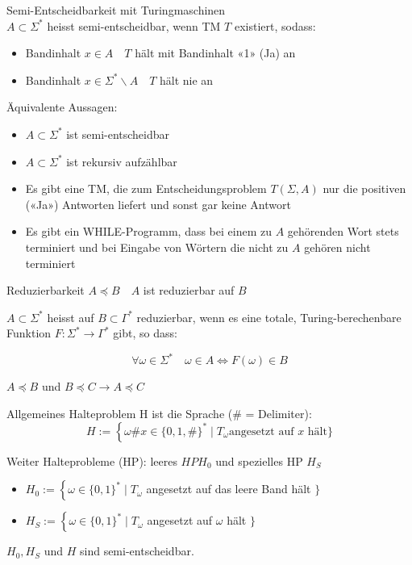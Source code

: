 \begin{concept}{Semi-Entscheidbarkeit mit Turingmaschinen}\\
    $A \subset \Sigma^{*}$ heisst semi-entscheidbar, wenn TM $T$ existiert, sodass:

    \begin{itemize}
    \item Bandinhalt $x \in A \quad T$ hält mit Bandinhalt «1» (Ja) an
    \item Bandinhalt $x \in \Sigma^{*} \backslash A \quad T$ hält nie an
    \end{itemize}

    \vspace{1mm}

    Äquivalente Aussagen:
    \begin{itemize}
    \item $A \subset \Sigma^{*}$ ist semi-entscheidbar
    \item $A \subset \Sigma^{*}$ ist rekursiv aufzählbar
    \item Es gibt eine TM, die zum Entscheidungsproblem $T(\Sigma, A)$ nur die positiven («Ja») Antworten liefert und sonst gar keine Antwort
    \item Es gibt ein WHILE-Programm, dass bei einem zu $A$ gehörenden Wort stets terminiert und bei Eingabe von Wörtern die nicht zu $A$ gehören nicht terminiert
    \end{itemize}
\end{concept}

\begin{theorem}{Reduzierbarkeit} $A \preccurlyeq B \quad A$ ist reduzierbar auf $B$

    $A \subset \Sigma^{*}$ heisst auf $B \subset \Gamma^{*}$ reduzierbar, wenn es eine totale, Turing-berechenbare Funktion $F: \Sigma^{*} \rightarrow \Gamma^{*}$ gibt, so dass:

    $$\forall \omega \in \Sigma^{*} \quad \omega \in A \Leftrightarrow F(\omega) \in B$$

   $A \preccurlyeq B$ und $B \preccurlyeq C \rightarrow A \preccurlyeq C$
\end{theorem}

\begin{concept}{Allgemeines Halteproblem H} ist die Sprache (\# = Delimiter):
    $$H:=\left\{\omega \# x \in\{0,1, \#\}^{*} \mid T_{\omega}\right. \text{angesetzt auf } x \text{ hält} \}$$
    
    Weiter Halteprobleme (HP): leeres $H P H_{0}$ und spezielles HP $H_{S}$
    \begin{itemize}
    \item $H_{0}:=\left\{\omega \in\{0,1\}^{*} \mid T_{\omega}\right.$ angesetzt auf das leere Band hält $\}$
    \item $H_{S}:=\left\{\omega \in\{0,1\}^{*} \mid T_{\omega}\right.$ angesetzt auf $\omega$ hält $\}$
    \end{itemize}
    $H_{0}, H_{S}$ und $H$ sind semi-entscheidbar.
\end{concept}